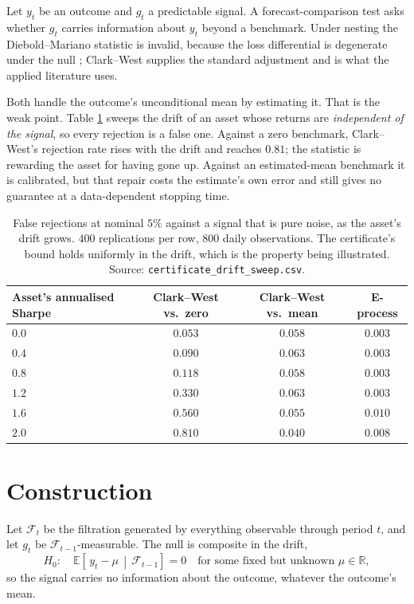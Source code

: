 \documentclass{article}
\begin{document}
Let $y_t$ be an outcome and $g_t$ a predictable signal. A forecast-comparison test asks whether
$g_t$ carries information about $y_t$ beyond a benchmark. Under nesting the Diebold--Mariano
statistic is invalid, because the loss differential is degenerate under the null
\citep{clark2001}; Clark--West \citep{clark2007} supplies the standard adjustment and is what
the applied literature uses.

Both handle the outcome's unconditional mean by estimating it. That is the weak point. Table
\ref{tab:drift} sweeps the drift of an asset whose returns are \emph{independent of the
signal}, so every rejection is a false one. Against a zero benchmark, Clark--West's rejection
rate rises with the drift and reaches $0.81$; the statistic is rewarding the asset for having
gone up. Against an estimated-mean benchmark it is calibrated, but that repair costs the
estimate's own error and still gives no guarantee at a data-dependent stopping time.

\begin{table}[h]
  \centering
  \caption{False rejections at nominal $5\%$ against a signal that is pure noise, as the
  asset's drift grows. $400$ replications per row, $800$ daily observations. The certificate's
  bound holds uniformly in the drift, which is the property being illustrated. Source:
  \texttt{certificate\_drift\_sweep.csv}.}
  \label{tab:drift}
  \small
  \begin{tabular}{lccc}
    \toprule
    Asset's annualised Sharpe & Clark--West vs.\ zero & Clark--West vs.\ mean & E-process \\
    \midrule
    $0.0$ & $0.053$ & $0.058$ & $0.003$ \\
    $0.4$ & $0.090$ & $0.063$ & $0.003$ \\
    $0.8$ & $0.118$ & $0.058$ & $0.003$ \\
    $1.2$ & $0.330$ & $0.063$ & $0.003$ \\
    $1.6$ & $0.560$ & $0.055$ & $0.010$ \\
    $2.0$ & $\mathbf{0.810}$ & $0.040$ & $0.008$ \\
    \bottomrule
  \end{tabular}
\end{table}

\section{Construction}

Let $\mathcal{F}_t$ be the filtration generated by everything observable through period $t$,
and let $g_t$ be $\mathcal{F}_{t-1}$-measurable. The null is composite in the drift,
\[
  H_0:\quad \mathbb{E}\!\left[\,y_t-\mu \,\middle|\, \mathcal{F}_{t-1}\right]=0
  \quad\text{for some fixed but unknown } \mu\in\mathbb{R},
\]
so the signal carries no information about the outcome, whatever the outcome's mean.
\end{document}
